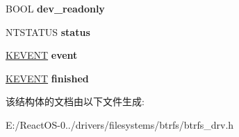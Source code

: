 \begin{DoxyCompactItemize}
B\+O\+OL {\bfseries dev\+\_\+readonly}
\item 
\mbox{\label{structbalance__info_abde2aa0aa5f8c33c2949b994a8d6b0cc}} 
N\+T\+S\+T\+A\+T\+US {\bfseries status}
\item 
\mbox{\label{structbalance__info_aa00932c1fee746e8fbe93aa147d04927}} 
\hyperlink{struct___k_e_v_e_n_t}{K\+E\+V\+E\+NT} {\bfseries event}
\item 
\mbox{\label{structbalance__info_aa69147b6d3be909f0dbd8a7ff4bedc7a}} 
\hyperlink{struct___k_e_v_e_n_t}{K\+E\+V\+E\+NT} {\bfseries finished}
\end{DoxyCompactItemize}


该结构体的文档由以下文件生成\+:\begin{DoxyCompactItemize}
\item 
E\+:/\+React\+O\+S-\/0../drivers/filesystems/btrfs/btrfs\+\_\+drv.\+h\end{DoxyCompactItemize}
